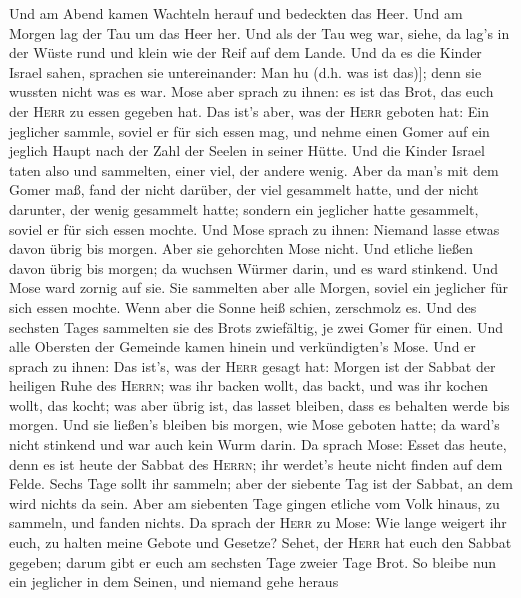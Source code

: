  Und am Abend kamen Wachteln herauf und bedeckten das
Heer. Und am Morgen lag der Tau um das Heer her.  Und als
der Tau weg war, siehe, da lag's in der Wüste rund und klein wie der
Reif auf dem Lande.  Und da es die Kinder Israel sahen,
sprachen sie untereinander: Man hu (d.h. was ist das){]}; denn sie
wussten nicht was es war. Mose aber sprach zu ihnen: es ist das Brot,
das euch der \textsc{Herr} zu essen gegeben hat.  Das
ist's aber, was der \textsc{Herr} geboten hat: Ein jeglicher sammle,
soviel er für sich essen mag, und nehme einen Gomer auf ein jeglich
Haupt nach der Zahl der Seelen in seiner Hütte.  Und die
Kinder Israel taten also und sammelten, einer viel, der andere wenig.
 Aber da man's mit dem Gomer maß, fand der nicht darüber,
der viel gesammelt hatte, und der nicht darunter, der wenig gesammelt
hatte; sondern ein jeglicher hatte gesammelt, soviel er für sich essen
mochte.  Und Mose sprach zu ihnen: Niemand lasse etwas
davon übrig bis morgen.  Aber sie gehorchten Mose nicht.
Und etliche ließen davon übrig bis morgen; da wuchsen Würmer darin, und
es ward stinkend. Und Mose ward zornig auf sie.  Sie
sammelten aber alle Morgen, soviel ein jeglicher für sich essen mochte.
Wenn aber die Sonne heiß schien, zerschmolz es.  Und des
sechsten Tages sammelten sie des Brots zwiefältig, je zwei Gomer für
einen. Und alle Obersten der Gemeinde kamen hinein und verkündigten's
Mose.  Und er sprach zu ihnen: Das ist's, was der
\textsc{Herr} gesagt hat: Morgen ist der Sabbat der heiligen Ruhe des
\textsc{Herrn}; was ihr backen wollt, das backt, und was ihr kochen
wollt, das kocht; was aber übrig ist, das lasset bleiben, dass es
behalten werde bis morgen.  Und sie ließen's bleiben bis
morgen, wie Mose geboten hatte; da ward's nicht stinkend und war auch
kein Wurm darin.  Da sprach Mose: Esset das heute, denn
es ist heute der Sabbat des \textsc{Herrn}; ihr werdet's heute nicht
finden auf dem Felde.  Sechs Tage sollt ihr sammeln; aber
der siebente Tag ist der Sabbat, an dem wird nichts da sein.
 Aber am siebenten Tage gingen etliche vom Volk hinaus,
zu sammeln, und fanden nichts.  Da sprach der
\textsc{Herr} zu Mose: Wie lange weigert ihr euch, zu halten meine
Gebote und Gesetze?  Sehet, der \textsc{Herr} hat euch
den Sabbat gegeben; darum gibt er euch am sechsten Tage zweier Tage
Brot. So bleibe nun ein jeglicher in dem Seinen, und niemand gehe heraus
